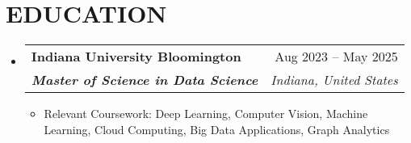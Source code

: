 \documentclass[letterpaper,11pt]{article}
\makeatletter
\newcommand{\resumeItem}[1]{
  \item\small{
    {#1 \vspace{-4pt}}
  }
}
\newcommand{\resumeSubheading}[4]{
  \vspace{-2pt}\item
    \begin{tabular*}{0.97\textwidth}[t]{l@{\extracolsep{\fill}}r}
      \textbf{#1} & #2 \\
      \textit{\small#3} & \textit{\small #4} \\
    \end{tabular*}\vspace{-7pt}
}
\newcommand{\resumeSubHeadingListStart}{\begin{itemize}[leftmargin=0.15in, label={}]}
\newcommand{\resumeSubHeadingListEnd}{\end{itemize}}
\newcommand{\resumeItemListStart}{\begin{itemize}}
\newcommand{\resumeItemListEnd}{\end{itemize}\vspace{-5pt}}
\makeatother
\begin{document}
\section{\textbf{EDUCATION}}
  \resumeSubHeadingListStart
  
    \resumeSubheading
      {Indiana University Bloomington}{\hfill Aug 2023 -- May 2025}
      {\textbf{Master of Science in Data Science}}{Indiana, United States}
      \resumeItemListStart
        \resumeItem{Relevant Coursework: Deep Learning, Computer Vision, Machine Learning, Cloud Computing, Big Data Applications, Graph Analytics}
      \resumeItemListEnd
    
  \resumeSubHeadingListEnd
\end{document}
